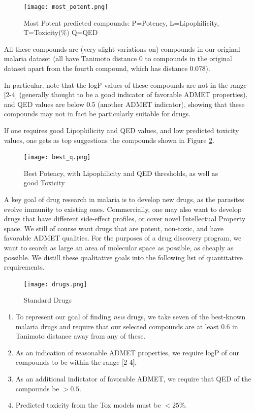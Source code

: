 \documentclass{article}
\begin{document}
\begin{figure}[h!]
\centering
\texttt{[image: most\_potent.png]}
\caption{Most Potent predicted compounds: P=Potency, L=Lipophilicity, T=Toxicity(\%) Q=QED}
\label{fig:mostpot}
\end{figure}


All these compounds are (very slight variations on) compounds in our original malaria dataset (all have Tanimoto distance 0 to compounds in the original dataset apart from the fourth compound, which has distance 0.078).  

In particular, note that the logP values of these compounds are not in the range [2-4] (generally thought to be a good indicator of favorable ADMET properties), and QED values are below 0.5 (another ADMET indicator), showing that these compounds may not in fact be particularly suitable for drugs.

If one requires good Lipophilicity and QED values, and low predicted toxicity values, one gets as top suggestions the compounds shown in Figure \ref{fig:best_q}.


\begin{figure}[h!]
\centering
\texttt{[image: best\_q.png]}
\caption{Best Potency, with Lipophilicity and QED thresholds, as well as good Toxicity}
\label{fig:best_q}
\end{figure}


A key goal of drug research in malaria is to develop new drugs, as the parasites evolve immunity to existing ones.  Commercially, one may also want to develop drugs that have different side-effect profiles, or cover novel Intellectual Property space.  We still of course want drugs that are potent, non-toxic, and have favorable ADMET qualities.  For the purposes of a drug discovery program, we want to search as large an area of molecular space as possible, as cheaply as possible.  We distill these qualitative goals into the following list of quantitative requirements. 


\begin{figure}[h!]
\centering
\texttt{[image: drugs.png]}
\caption{Standard Drugs}
\label{fig:drugs}
\end{figure}

\begin{enumerate}
    \item To represent our goal of finding \textit{new} drugs, we take seven of the best-known malaria drugs and require that our selected compounds are at least 0.6 in Tanimoto distance away from any of these.
    \item As an indication of reasonable ADMET properties, we require logP of our compounds to be within the range [2-4]\cite{Hansch1971}.
    \item As an additional indictator of favorable ADMET, we require that QED of the compounds be $> 0.5$.
    \item Predicted toxicity from the Tox models must be $< 25\%$.
\end{enumerate}
\end{document}

